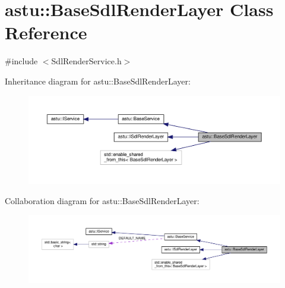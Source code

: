 \hypertarget{classastu_1_1BaseSdlRenderLayer}{}\section{astu\+:\+:Base\+Sdl\+Render\+Layer Class Reference}
\label{classastu_1_1BaseSdlRenderLayer}


{\ttfamily \#include $<$Sdl\+Render\+Service.\+h$>$}



Inheritance diagram for astu\+:\+:Base\+Sdl\+Render\+Layer\+:\nopagebreak
\begin{figure}[H]
\begin{center}
\leavevmode
\includegraphics[width=350pt]{classastu_1_1BaseSdlRenderLayer__inherit__graph}
\end{center}
\end{figure}


Collaboration diagram for astu\+:\+:Base\+Sdl\+Render\+Layer\+:\nopagebreak
\begin{figure}[H]
\begin{center}
\leavevmode
\includegraphics[width=350pt]{classastu_1_1BaseSdlRenderLayer__coll__graph}
\end{center}
\end{figure}
